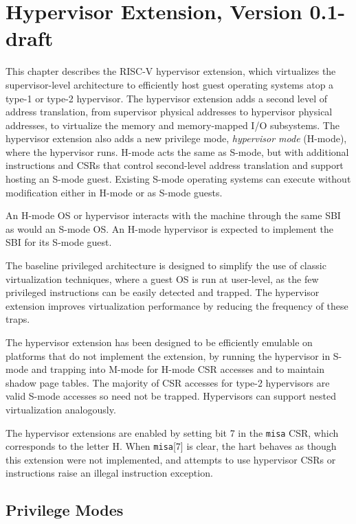 \chapter{Hypervisor Extension, Version 0.1-draft}
\label{hypervisor}

This chapter describes the RISC-V hypervisor extension, which virtualizes the
supervisor-level architecture to efficiently host guest operating systems atop
a type-1 or type-2 hypervisor.  The hypervisor extension adds a second level
of address translation, from supervisor physical addresses to
hypervisor physical addresses, to virtualize the memory and memory-mapped I/O
subsystems.  The hypervisor extension also adds a new privilege mode, {\em
hypervisor mode} (H-mode), where the hypervisor runs.  H-mode acts the same as
S-mode, but with additional instructions and CSRs that control second-level
address translation and support hosting an S-mode guest.  Existing S-mode
operating systems can execute without modification either in H-mode or as
S-mode guests.

An H-mode OS or hypervisor interacts with the machine through the same SBI
as would an S-mode OS.  An H-mode hypervisor is expected to implement the
SBI for its S-mode guest.

\begin{commentary}
The baseline privileged architecture is designed to simplify the use of classic
virtualization techniques, where a guest OS is run at user-level, as
the few privileged instructions can be easily detected and trapped.
The hypervisor extension improves virtualization performance by
reducing the frequency of these traps.

The hypervisor extension has been designed to be efficiently
emulable on platforms that do not implement the extension, by running
the hypervisor in S-mode and trapping into M-mode for H-mode CSR accesses
and to maintain shadow page tables.  The majority of CSR accesses for
type-2 hypervisors are valid S-mode accesses so need not be trapped.
Hypervisors can support nested virtualization analogously.
\end{commentary}

The hypervisor extensions are enabled by setting bit 7 in the {\tt misa} CSR,
which corresponds to the letter H.  When {\tt misa}[7] is clear, the hart
behaves as though this extension were not implemented, and attempts to use
hypervisor CSRs or instructions raise an illegal instruction exception.

\section{Privilege Modes}

